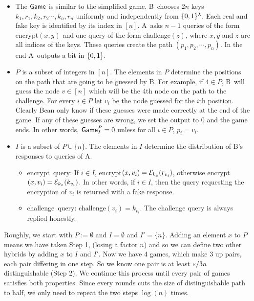 \documentclass{article}
\def\B{{\sf B}}
\def\A{{\sf A}}
\def\E{{\cal E}}
\newcommand{\encrypt}{{\sf encrypt}}
\newcommand{\game}{{\sf Game}}
\newcommand{\dgg}[2]{\game_{#1}^{#2}}
\def\challenge{{\sf challenge}}
\begin{document}
\begin{itemize}
\item The $\game$ is similar to the simplified game. \B~chooses $2n$ keys $k_1,r_1,k_2,r_2\cdots,k_n,r_n$ uniformly and independently from $\{0,1\}^\lambda$. Each real and fake key is identified by its index in $[n]$. \A~asks $n-1$ queries of the form \encrypt$(x,y)$ and one query of the form \challenge$(z)$, where $x,y$ and $z$ are all indices of the keys. These queries create the path $(p_1,p_2,\cdots, p_n)$. In the end \A~outputs a bit in $\{0,1\}$.
 
\item $P$ is a subset of integers in $[n]$. The elements in $P$ determine the positions on the path that are going to be guessed by \B. For example, if $4\in P$, \B~will guess the node $v\in [n]$  which will be the 4th node on the path to the challenge. For every $i \in P$ let $v_i$ be the node guessed for the $i$th position. Clearly \B can only know if these guesses were made correctly at the end of the game. If any of these guesses are wrong, we set the output to $0$ and the game ends. In other words, $\dgg{I}{P}=0$ unless for all $i\in P$, $p_i=v_i$.

\item $I$ is a subset of $P\cup \{n\}$. The elements in $I$ determine the distribution of \B's responses to queries of \A.
\begin{itemize}
\item \encrypt~query: If $i\in I$, \encrypt$(x,v_i)=\E_{k_x}(r_{v_i})$, otherwise \encrypt$(x,v_i)=\E_{k_x}(k_{v_i})$. In other words, if $i\in I$, then the query requesting the encryption of $v_i$ is returned with a fake response.
\item \challenge~query: \challenge$(v_i)=k_{v_i}$. The challenge query is always replied honestly. 
\end{itemize}
\end{itemize}

Roughly, we start with $P:=\emptyset$ and $I=\emptyset$ and $I'=\{n\}$. Adding an element $x$ to $P$ means we have taken Step 1, (losing a factor $n$) and so we can define two other hybrids by adding $x$ to $I$ and $I'$. Now we have 4 games, which make 3 up pairs, each pair differing in one step. So we know one pair is at least $\varepsilon/3n$ distinguishable (Step 2). We continue this process until every pair of games satisfies both properties. Since every rounds cuts the size of distinguishable path to half, we only need to repeat the two steps $\log(n)$ times. 
\end{document}
